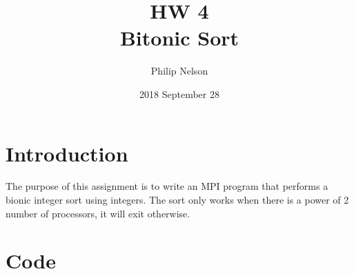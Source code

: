 \documentclass{article}
\title{HW 4 \\ Bitonic Sort}
\author{Philip Nelson}
\date{2018 September 28}
\begin{document}
\maketitle

\section*{Introduction}

The purpose of this assignment is to write an MPI program that performs a bionic integer sort using integers. The sort only works when there is a power of 2 number of processors, it will exit otherwise.

\section*{Code}
\end{document}
